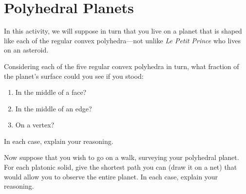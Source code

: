 \newpage
\section{Polyhedral Planets}	


In this activity, we will suppose in turn that you live on a planet
that is shaped like each of the regular convex polyhedra---not unlike
\textit{Le Petit Prince} who lives on an asteroid.

\begin{prob}
Considering each of the five regular convex polyhedra in turn, what
fraction of the planet's surface could you see if you stood:
\begin{enumerate}
\item In the middle of a face? 
\item In the middle of an edge?
\item On a vertex?
\end{enumerate}
In each case, explain your reasoning.
\end{prob}



\begin{prob}
Now suppose that you wish to go on a walk, surveying your polyhedral
planet. For each platonic solid, give the shortest path you can (draw
it on a net) that would allow you to observe the entire planet. In
each case, explain your reasoning.
\end{prob}
